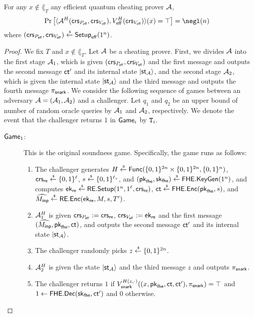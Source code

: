 \begin{theorem}[Soundness]\label{thm:eff_soundness}
For any $x\notin \lang_T$ any efficient quantum cheating prover $\A$, 
\begin{align*}
\Pr\left[\langle\A^H(\crs_{\proeff},\crs_{\vereff}),\vereff^H(\crs_{\vereff})\rangle(x)=\top\right]=\negl(\secpar)    
\end{align*}
where $(\crs_{\proeff},\crs_{\vereff})\sample \setupeff(1^\secpar)$.
\end{theorem}
\begin{proof}
We fix $T$ and $x\notin \lang_T$.
Let $\A$ be a cheating prover.
First, we divides $\A$ into the first stage $\A_1$, which is given $(\crs_{\proeff},\crs_{\vereff})$ and the first message and outputs the second message $\ct'$ and its internal state $\ket{\st_{\A}}$, and the second stage $\A_2$, which is given the internal state $\ket{\st_{\A}}$ and the third message and outputs the fourth message $\pi_{\snark}$.
We consider the following sequence of games between an adversary $\A=(\A_1,\A_2)$ and a challenger. 
Let $q_1$ and $q_2$ be an upper bound of number of random oracle queries by $\A_1$ and $\A_2$, respectively.
We denote the event that the challenger returns $1$ in $\game_i$ by $\TT_i$.
\begin{description}
\item[$\game_1$:] This is the original soundness game.
Specifically, the game runs as follows:
\begin{enumerate}
    \item The challenger generates 
    $H\sample \func(\bit^{2\secpar}\times \bit^{2\secpar},\bit^{\secpar})$, 
    $\crs_\re\sample \bit^{\ell}$, %
    $s\sample \bit^{\ell_s}$, and $(\pk_{\fhe},\sk_{\fhe})\sample \fhekeygen(1^\secpar)$, and computes $\ek_\re\sample \rsetup(1^\secpar,1^\ell,\crs_\re)$,  %
    $\ct\sample \fheenc(\pk_{\fhe},s)$, and  $\Menc\sample \renc(\ek_\re,M,s,T')$.
    \item $\A_1^{H}$ is given $\crs_{\proeff}\defeq \crs_\re$, $\crs_{\vereff}\defeq \ek_\re$ and the first message $(\Menc,\pk_{\fhe},\ct)$, and outputs the second message $\ct'$ and its internal state $\ket{\st_{\A}}$.
    \item The challenger randomly picks $z\sample \bit^{2\secpar}$.
    \item $\A_2^{H}$ is given the state $\ket{\st_{\A}}$ and the third message $z$ and outputs $\pi_{\snark}$.
    \item The challenger returns $1$ if  $\ver_{\snark}^{H(z,\cdot)}((x,\pk_{\fhe},\ct,\ct'),\pi_{\snark})=\top$ and $1 \la \fhedec(\sk_{\fhe},\ct')$ and $0$ otherwise.
\end{enumerate}


\end{description}
\end{proof}
